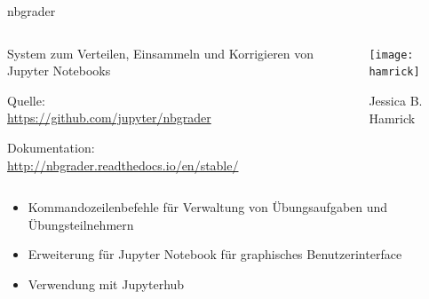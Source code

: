 \documentclass[t, utf8, 10pt]{beamer}
\begin{document}
\begin{frame}{nbgrader}
 \begin{columns}
  \begin{column}{0.7\textwidth}
   System zum Verteilen, Einsammeln und Korrigieren von Jupyter Notebooks

   \vspace{0.5\baselineskip}
   Quelle:\\
   \small{\url{https://github.com/jupyter/nbgrader}}

   \vspace{0.5\baselineskip}
   Dokumentation:\\
   \small{\url{http://nbgrader.readthedocs.io/en/stable/}}
  \end{column}%
  \begin{column}{0.3\textwidth}
   \begin{center}
    \vspace{-0.7truecm}
    \texttt{[image: hamrick]}

    Jessica B. Hamrick
   \end{center}
  \end{column}
 \end{columns}

 \vspace{1truecm}
 \begin{itemize}
  \item Kommandozeilenbefehle für Verwaltung von Übungsaufgaben und
        Übungsteilnehmern
  \item Erweiterung für Jupyter Notebook für graphisches Benutzerinterface
  \item Verwendung mit Jupyterhub
 \end{itemize}
\end{frame}
\end{document}
